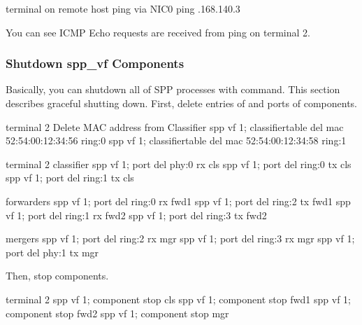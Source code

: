 \documentclass[a4paper,11pt,openany,oneside,english]{sphinxmanual}
\begin{document}
\begin{sphinxVerbatim}[commandchars=\\\{\},formatcom=\footnotesize]
 terminal  on remote host
 ping via NIC0
 ping .168.140.3
\end{sphinxVerbatim}

You can see ICMP Echo requests are received from ping on terminal 2.


\subsubsection{Shutdown spp\_vf Components}
\label{\detokenize{usecases/spp_vf:shutdown-spp-vf-components}}\label{\detokenize{usecases/spp_vf:spp-vf-use-cases-shutdown-comps}}
Basically, you can shutdown all of SPP processes with 
command.
This section describes graceful shutting down.
First, delete entries of  and ports of components.

\begin{sphinxVerbatim}[commandchars=\\\{\},formatcom=\footnotesize]
\PYGZsh{} terminal 2
\PYGZsh{} Delete MAC address from Classifier
spp \PYGZgt{} vf 1; classifier\PYGZus{}table del mac 52:54:00:12:34:56 ring:0
spp \PYGZgt{} vf 1; classifier\PYGZus{}table del mac 52:54:00:12:34:58 ring:1
\end{sphinxVerbatim}

\begin{sphinxVerbatim}[commandchars=\\\{\},formatcom=\footnotesize]
\PYGZsh{} terminal 2
\PYGZsh{} classifier
spp \PYGZgt{} vf 1; port del phy:0 rx cls
spp \PYGZgt{} vf 1; port del ring:0 tx cls
spp \PYGZgt{} vf 1; port del ring:1 tx cls

\PYGZsh{} forwarders
spp \PYGZgt{} vf 1; port del ring:0 rx fwd1
spp \PYGZgt{} vf 1; port del ring:2 tx fwd1
spp \PYGZgt{} vf 1; port del ring:1 rx fwd2
spp \PYGZgt{} vf 1; port del ring:3 tx fwd2

\PYGZsh{} mergers
spp \PYGZgt{} vf 1; port del ring:2 rx mgr
spp \PYGZgt{} vf 1; port del ring:3 rx mgr
spp \PYGZgt{} vf 1; port del phy:1 tx mgr
\end{sphinxVerbatim}

Then, stop components.

\begin{sphinxVerbatim}[commandchars=\\\{\},formatcom=\footnotesize]
\PYGZsh{} terminal 2
spp \PYGZgt{} vf 1; component stop cls
spp \PYGZgt{} vf 1; component stop fwd1
spp \PYGZgt{} vf 1; component stop fwd2
spp \PYGZgt{} vf 1; component stop mgr
\end{sphinxVerbatim}
\end{document}
